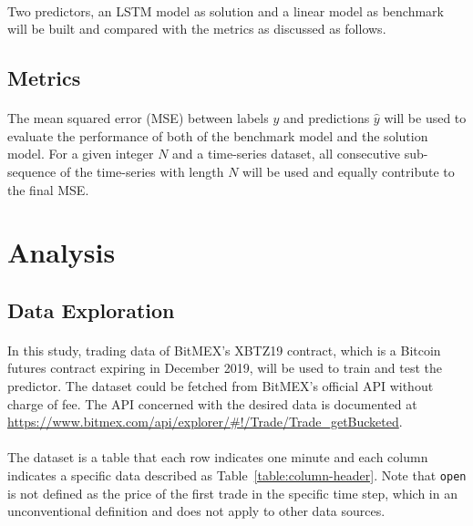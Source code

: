 \documentclass[12pt, letterpaper]{article}
\begin{document}
\paragraph{}
Two predictors, an LSTM model as solution and a linear model as benchmark will be built and compared with the metrics as discussed as follows.

\subsection{Metrics}

\paragraph{}
The mean squared error (MSE) between labels \(y\) and predictions \(\hat y\) will be used to evaluate the performance of both of the benchmark model and the solution model. For a given integer \(N\) and a time-series dataset, all consecutive sub-sequence of the time-series with length \(N\) will be used and equally contribute to the final MSE\@.

\section{Analysis} %

\subsection{Data Exploration}

\paragraph{}
In this study, trading data of BitMEX's XBTZ19 contract, which is a Bitcoin futures contract expiring in December 2019, will be used to train and test the predictor. The dataset could be fetched from BitMEX's official API without charge of fee. The API concerned with the desired data is documented at \url{https://www.bitmex.com/api/explorer/#!/Trade/Trade_getBucketed}.

\paragraph{}
The dataset is a table that each row indicates one minute and each column indicates a specific data described as Table~\ref{table:column-header}. Note that \texttt{open} is not defined as the price of the first trade in the specific time step, which in an unconventional definition and does not apply to other data sources.
\end{document}
